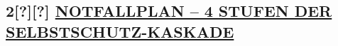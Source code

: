 \hypertarget{section}{%
\subsection{}\label{section}}

\hypertarget{section-1}{%
\subsection{}\label{section-1}}

\hypertarget{notfallplan-4-stufen-der-selbstschutz-kaskade}{%
\subsection{\texorpdfstring{\textbf{2[?][?] \ul{NOTFALLPLAN -- 4 STUFEN DER SELBSTSCHUTZ-KASKADE}}}{2[?][?] NOTFALLPLAN -- 4 STUFEN DER SELBSTSCHUTZ-KASKADE}}\label{notfallplan-4-stufen-der-selbstschutz-kaskade}}

